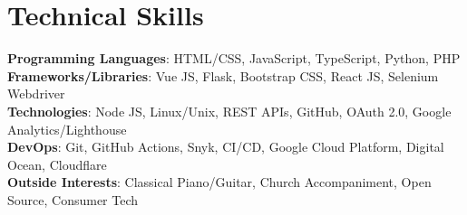 \section{Technical Skills}
 \begin{itemize}[leftmargin=0.15in, label={}]
    \small{\item{
     \textbf{Programming Languages}{: HTML/CSS, JavaScript, TypeScript, Python, PHP} \\
     \textbf{Frameworks/Libraries}{: Vue JS, Flask, Bootstrap CSS, React JS, Selenium Webdriver} \\
     \textbf{Technologies}{: Node JS, Linux/Unix, REST APIs, GitHub, OAuth 2.0, Google Analytics/Lighthouse } \\
     \textbf{DevOps}{: Git, GitHub Actions, Snyk, CI/CD, Google Cloud Platform, Digital Ocean, Cloudflare } \\
     \textbf{Outside Interests}{: Classical Piano/Guitar, Church Accompaniment, Open Source, Consumer Tech}
    }}
 \end{itemize} 